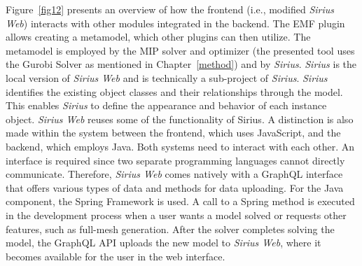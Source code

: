     Figure~\ref{fig12} presents an overview of how the frontend (i.e., modified \textit{Sirius Web}) interacts with other modules integrated in the backend. The EMF plugin allows creating a metamodel, which other plugins can then utilize. The metamodel is employed by the MIP solver and optimizer (the presented tool uses the Gurobi Solver as mentioned in Chapter~\ref{method}) and by \textit{Sirius}. \textit{Sirius} is the local version of \textit{Sirius Web} and is technically a sub-project of \textit{Sirius}. \textit{Sirius} identifies the existing object classes and their relationships through the model. This enables \textit{Sirius} to define the appearance and behavior of each instance object.
    \textit{Sirius Web} reuses some of the functionality of Sirius. A distinction is also made within the system between the frontend, which uses JavaScript, and the backend, which employs Java. Both systems need to interact with each other. An interface is required since two separate programming languages cannot directly communicate. Therefore, \textit{Sirius Web} comes natively with a GraphQL interface that offers various types of data and methods for data uploading. For the Java component, the Spring Framework is used. A call to a Spring method is executed in the development process when a user wants a model solved or requests other features, such as full-mesh generation. After the solver completes solving the model, the GraphQL API uploads the new model to \textit{Sirius Web}, where it becomes available for the user in the web interface.
